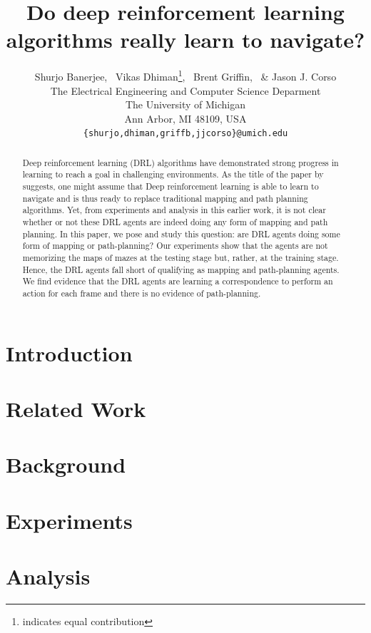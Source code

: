 \documentclass{article} %
\title{Do deep reinforcement learning algorithms really learn to navigate?}
\author{Shurjo Banerjee\footnotemark[1],%
  \, Vikas Dhiman\thanks{indicates equal contribution},%
  \, Brent Griffin,%
  \, \& Jason J. Corso\\
  The Electrical Engineering and Computer Science Deparment\\
The University of Michigan\\
Ann Arbor, MI 48109, USA \\
\texttt{\{shurjo,dhiman,griffb,jjcorso\}@umich.edu} \\
}
\begin{document}
\maketitle
\begin{abstract}
  Deep reinforcement learning (DRL) algorithms have demonstrated strong progress in learning to reach a goal in challenging environments.
  As the title of the paper by \cite{MiPaViICLR2017} suggests, one might assume that Deep reinforcement learning is able to learn to navigate and is thus ready to replace traditional mapping and path planning algorithms.
  Yet, from experiments and analysis in this earlier work, it is not clear whether or not these DRL agents are indeed doing any form of mapping and path planning.
  In this paper, we pose and study this question: are DRL agents doing some form of mapping or path-planning?  Our experiments show that the agents are not memorizing the maps of mazes at the testing stage but, rather, at the training stage.
  Hence, the DRL agents fall short of qualifying as mapping and path-planning agents.
  We find evidence that the DRL agents are learning a correspondence to perform an action for each frame and there is no evidence of path-planning.
\end{abstract}

\section{Introduction}
%


\section{Related Work}


\section{Background}


%
\section{Experiments}


\section{Analysis}

\end{document}

